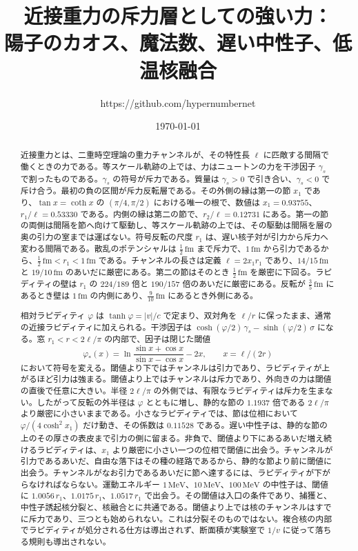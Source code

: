 \documentclass[a4paper]{article}
\title{近接重力の斥力層としての強い力：\\
陽子のカオス、魔法数、遅い中性子、低温核融合}
\author{https://github.com/hypernumbernet}
\date{\today}
\begin{document}
\maketitle

\begin{abstract}
近接重力とは、二重時空理論の重力チャンネルが、その特性長 \(\ell\) に匹敵する間隔で働くときの力である。等スケール軌跡の上では、力はニュートンの力を干渉因子 \(\gamma_s\) で割ったものである。\(\gamma_s\) の符号が斥力である。質量は \(\gamma_s>0\) で引き合い、\(\gamma_s<0\) で斥け合う。最初の負の区間が斥力反転層である。その外側の縁は第一の節 \(x_1\) であり、\(\tan x=\coth x\) の \((\pi/4,\pi/2)\) における唯一の根で、数値は \(x_1=0.93755\)、\(r_1/\ell=0.53330\) である。内側の縁は第二の節で、\(r_2/\ell=0.12731\) にある。第一の節の両側は間隔を節へ向けて駆動し、等スケール軌跡の上では、その駆動は間隔を層の奥の引力の室までは運ばない。符号反転の尺度 \(r_1\) は、遅い核子対が引力から斥力へ変わる間隔である。散乱のポテンシャルは \(\tfrac12\,\mathrm{fm}\) まで斥力で、\(1\,\mathrm{fm}\) から引力であるから、\(\tfrac12\,\mathrm{fm}<r_1<1\,\mathrm{fm}\) である。チャンネルの長さは定義 \(\ell=2x_1 r_1\) であり、\(14/15\,\mathrm{fm}\) と \(19/10\,\mathrm{fm}\) のあいだに厳密にある。第二の節はそのとき \(\tfrac12\,\mathrm{fm}\) を厳密に下回る。ラピディティの壁は \(r_1\) の \(224/189\) 倍と \(190/157\) 倍のあいだに厳密にある。反転が \(\tfrac35\,\mathrm{fm}\) にあるとき壁は \(1\,\mathrm{fm}\) の内側にあり、\(\tfrac9{10}\,\mathrm{fm}\) にあるとき外側にある。

相対ラピディティ \(\varphi\) は \(\tanh\varphi=|v|/c\) で定まり、双対角を \(\ell/r\) に保ったまま、通常の近接ラピディティに加えられる。干渉因子は \(\cosh(\varphi/2)\,\gamma_s-\sinh(\varphi/2)\,\sigma\) になる。窓 \(r_1<r<2\ell/\pi\) の内部で、因子は閉じた閾値
\[
\varphi_*(x)=\ln\frac{\sin x+\cos x}{\sin x-\cos x}-2x,
\qquad x=\ell/(2r)
\]
において符号を変える。閾値より下ではチャンネルは引力であり、ラピディティが上がるほど引力は強まる。閾値より上ではチャンネルは斥力であり、外向きの力は閾値の直後で任意に大きい。半径 \(2\ell/\pi\) の外側では、有限なラピディティは斥力を生まない。したがって反転の外半径は \(\varphi\) とともに増し、静的な節の \(1.1937\) 倍である \(2\ell/\pi\) より厳密に小さいままである。小さなラピディティでは、節は位相において \(\varphi/(4\cosh^2 x_1)\) だけ動き、その係数は \(0.11528\) である。遅い中性子は、静的な節の上のその厚さの表皮まで引力の側に留まる。非負で、閾値より下にあるあいだ増え続けるラピディティは、\(x_1\) より厳密に小さい一つの位相で閾値に出会う。チャンネルが引力であるあいだ、自由な落下はその種の経路であるから、静的な節より前に閾値に出会う。チャンネルがなお引力であるあいだに節へ達するには、ラピディティが下がらなければならない。運動エネルギー \(1\,\mathrm{MeV}\)、\(10\,\mathrm{MeV}\)、\(100\,\mathrm{MeV}\) の中性子は、閾値に \(1.0056\,r_1\)、\(1.0175\,r_1\)、\(1.0517\,r_1\) で出会う。その閾値は入口の条件であり、捕獲と、中性子誘起核分裂と、核融合とに共通である。閾値より上では核のチャンネルはすでに斥力であり、三つとも始められない。これは分裂そのものではない。複合核の内部でラピディティが処分される仕方は導出されず、断面積が実験室で \(1/v\) に従って落ちる規則も導出されない。


\end{abstract}
\end{document}
